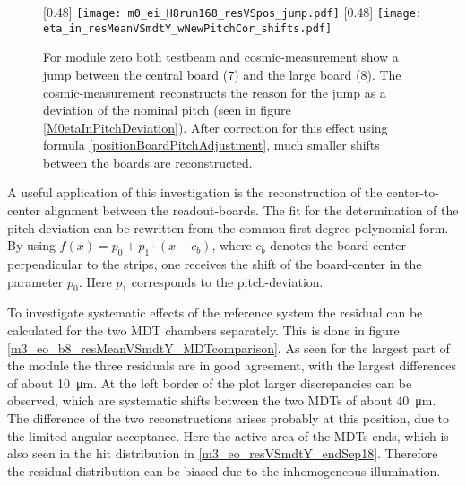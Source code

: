 \documentclass[
twoside,            %
BCOR1.4cm,          %
10pt,               %
headings=normal,    %
headsepline,        %
clearplainpage,		%
final,              %
div=14,
open=right,
bibliography=toc
]{scrreprt}
\begin{document}
\begin{figure}[!h]
	\centering
	[0.48\textwidth]
	{\texttt{[image: m0\_ei\_H8run168\_resVSpos\_jump.pdf]}}
	\hfill
	[0.48\textwidth]
	{\texttt{[image: eta\_in\_resMeanVSmdtY\_wNewPitchCor\_shifts.pdf]}}
	\vspace{-2mm}
	\caption{
		For module zero both testbeam and cosmic-measurement show a jump between the central board (7) and the large board (8). 
		The cosmic-measurement reconstructs the reason for the jump as a deviation of the nominal pitch (seen in figure \ref{M0etaInPitchDeviation}).
		After correction for this effect using formula \ref{positionBoardPitchAdjustment}, much smaller shifts between the boards are reconstructed.
	}
	\label{m0eiJump}
\end{figure}

A useful application of this investigation is the reconstruction of the center-to-center alignment between the readout-boards.
The fit for the determination of the pitch-deviation can be rewritten from the common first-degree-polynomial-form.
By using $f(x) = p_{0} + p_{1} \cdot ( x - c_{b} )$, where $c_{b}$ denotes the board-center perpendicular to the strips, one receives the shift of the board-center in the parameter $p_{0}$.
Here $p_{1}$ corresponds to the pitch-deviation.

To investigate systematic effects of the reference system the residual can be calculated for the two MDT chambers separately.
This is done in figure \ref{m3_eo_b8_resMeanVSmdtY_MDTcomparison}.
As seen for the largest part of the module the three residuals are in good agreement, with the largest differences of about \SI{10}{\micro m}.
At the left border of the plot larger discrepancies can be observed, which are systematic shifts between the two MDTs of about \SI{40}{\micro m}.
The difference of the two reconstructions arises probably at this position, due to the limited angular acceptance.
Here the active area of the MDTs ends, which is also seen in the hit distribution in \ref{m3_eo_resVSmdtY_endSep18}.
Therefore the residual-distribution can be biased due to the inhomogeneous illumination. 
\end{document}
